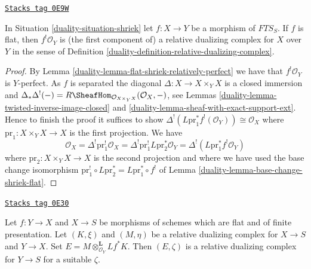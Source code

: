 \begin{lemma}
\label{duality-lemma-compactifyable-relative-dualizing}
\href{https://stacks.math.columbia.edu/tag/0E9W}{\texttt{Stacks tag 0E9W}}

In Situation \ref{duality-situation-shriek} let $f : X \to Y$
be a morphism of $\textit{FTS}_S$. If $f$ is flat, then
$f^!\mathcal{O}_Y$ is (the first component of)
a relative dualizing complex for $X$ over $Y$ in the sense of
Definition \ref{duality-definition-relative-dualizing-complex}.
\end{lemma}

\begin{proof}

By Lemma \ref{duality-lemma-flat-shriek-relatively-perfect}
we have that $f^!\mathcal{O}_Y$
is $Y$-perfect. As $f$ is separated the diagonal
$\Delta : X \to X \times_Y X$ is a closed immersion and
$\Delta_*\Delta^!(-) =
R\SheafHom_{\mathcal{O}_{X \times_Y X}}(\mathcal{O}_X, -)$, see
Lemmas
\ref{duality-lemma-twisted-inverse-image-closed} and
\ref{duality-lemma-sheaf-with-exact-support-ext}.
Hence to finish the proof it suffices to show
$\Delta^!(L\text{pr}_1^*f^!(\mathcal{O}_Y)) \cong \mathcal{O}_X$
where $\text{pr}_1 : X \times_Y X \to X$ is the first projection.
We have
$$
\mathcal{O}_X = \Delta^! \text{pr}_1^!\mathcal{O}_X =
\Delta^! \text{pr}_1^! L\text{pr}_2^*\mathcal{O}_Y =
\Delta^!(L\text{pr}_1^* f^!\mathcal{O}_Y)
$$
where $\text{pr}_2 : X \times_Y X \to X$ is the second projection
and where we have used the base change isomorphism
$\text{pr}_1^! \circ L\text{pr}_2^* = L\text{pr}_1^* \circ f^!$ of
Lemma \ref{duality-lemma-base-change-shriek-flat}.
\end{proof}

\begin{lemma}
\label{duality-lemma-relative-dualizing-composition}
\href{https://stacks.math.columbia.edu/tag/0E30}{\texttt{Stacks tag 0E30}}

Let $f : Y \to X$ and $X \to S$ be morphisms of schemes
which are flat and of finite presentation.
Let $(K, \xi)$ and $(M, \eta)$
be a relative dualizing complex for $X \to S$ and $Y \to X$.
Set $E = M \otimes_{\mathcal{O}_Y}^\mathbf{L} Lf^*K$.
Then $(E, \zeta)$ is a relative dualizing complex for $Y \to S$ for
a suitable $\zeta$.
\end{lemma}

